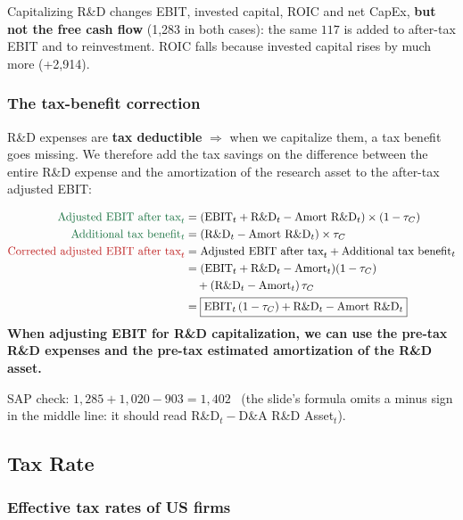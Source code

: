 \begin{keybox}
Capitalizing R\&D changes EBIT, invested capital, ROIC and net CapEx, \textbf{but not the free cash flow} (1,283 in both cases): the same $117$ is added to after-tax EBIT and to reinvestment. ROIC falls because invested capital rises by much more (+2,914).
\end{keybox}

\subsubsection*{The tax-benefit correction}
R\&D expenses are \textbf{tax deductible} $\Rightarrow$ when we capitalize them, a tax benefit goes missing. We therefore add the tax savings on the difference between the entire R\&D expense and the amortization of the research asset to the after-tax adjusted EBIT:
\begin{keybox}
\begin{align*}
\textcolor{addgreen}{\text{Adjusted EBIT after tax}_t} &= (\text{EBIT}_t + \text{R\&D}_t - \text{Amort R\&D}_t)\times(1-\tau_C)\\
\textcolor{addgreen}{\text{Additional tax benefit}_t} &= (\text{R\&D}_t - \text{Amort R\&D}_t)\times\tau_C\\
\textcolor{keyred}{\text{Corrected adjusted EBIT after tax}_t} &= \text{Adjusted EBIT after tax}_t + \text{Additional tax benefit}_t\\
&= (\text{EBIT}_t + \text{R\&D}_t - \text{Amort}_t)(1-\tau_C)\\
&\quad + (\text{R\&D}_t - \text{Amort}_t)\,\tau_C\\
&= \boxed{\text{EBIT}_t\,(1-\tau_C) + \text{R\&D}_t - \text{Amort R\&D}_t}
\end{align*}
\textbf{When adjusting EBIT for R\&D capitalization, we can use the pre-tax R\&D expenses and the pre-tax estimated amortization of the R\&D asset.}
\end{keybox}
SAP check: $1{,}285+1{,}020-903=1{,}402$ \checkmark\ (the slide's formula omits a minus sign in the middle line: it should read R\&D$_t-$D\&A R\&D Asset$_t$).

\subsection{Tax Rate}

\subsubsection*{Effective tax rates of US firms}

